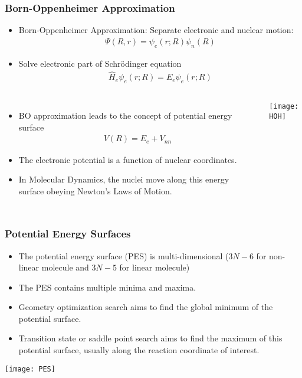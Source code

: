 \documentclass[slidestop,mathserif,compress,xcolor=svgnames]{beamer}
\begin{document}
\begin{frame}
  \frametitle{\small Born-Oppenheimer Approximation}
  \begin{itemize}
    \item Born-Oppenheimer Approximation: Separate electronic and nuclear motion:
    \begin{align*}
      \Psi(R,r) = \psi_e(r;R)\psi_n(R)
    \end{align*}
    \item Solve electronic part of Schr\"{o}dinger equation
    \begin{align*}
      \hat{H}_e\psi_e(r;R) = E_e\psi_e(r;R)
    \end{align*}
  \end{itemize}
  \begin{columns}
    \column{5cm}
    \vspace{-0.5cm}
    \begin{itemize}
      \item BO approximation leads to the concept of potential energy surface
      \begin{align*}
	V(R) = E_e + V_{nn}
      \end{align*}
      \item The electronic potential is a function of nuclear coordinates.
      \item In Molecular Dynamics, the nuclei move along this energy surface obeying Newton's Laws of Motion.
    \end{itemize}
    \column{6cm}
    \vspace{-0.5cm}
    \begin{exampleblock}{}
      \texttt{[image: HOH]}
    \end{exampleblock}
  \end{columns}
\end{frame}

\begin{frame}
  \frametitle{\small Potential Energy Surfaces}
  \begin{itemize}
    \item The potential energy surface (PES) is multi-dimensional ($3N-6$ for non-linear molecule and $3N-5$ for linear molecule)
    \item The PES contains multiple minima and maxima.\let\thefootnote\relax{}
    \item Geometry optimization search aims to find the global minimum of the potential surface.
    \item Transition state or saddle point search aims to find the maximum of this potential surface, usually along the reaction coordinate of interest.
  \end{itemize}
  \begin{center}
    \texttt{[image: PES]}
  \end{center}
\end{frame}
\end{document}
